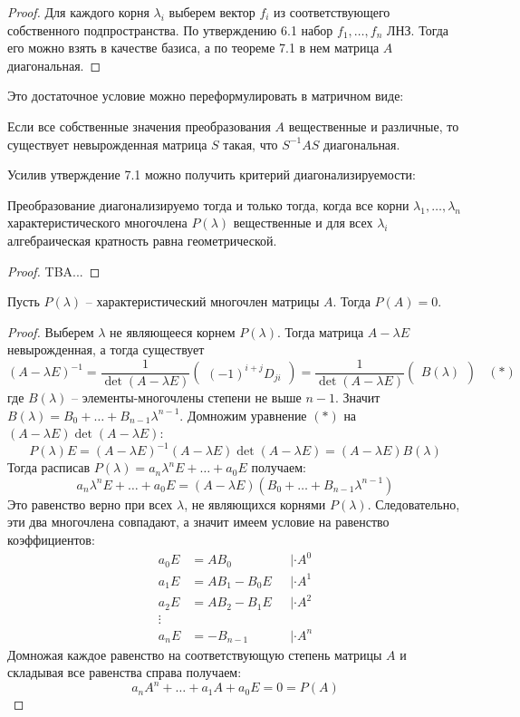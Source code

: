 \begin{proof}
    Для каждого корня $\lambda_i$ выберем вектор $f_i$ из соответствующего собственного подпространства. По утверждению 6.1 набор $f_1, \dots, f_n$ ЛНЗ. Тогда его можно взять в качестве базиса, а по теореме 7.1 в нем матрица $A$ диагональная.
\end{proof}
Это достаточное условие можно переформулировать в матричном виде:
\begin{theorem}
    Если все собственные значения преобразования $A$ вещественные и различные, то существует невырожденная матрица $S$ такая, что $S^{-1}AS$ диагональная.
\end{theorem}
Усилив утверждение 7.1 можно получить критерий диагонализируемости:
\begin{theorem} 
    Преобразование диагонализируемо тогда и только тогда, когда все корни $\lambda_1, \dots , \lambda_n$ характеристического многочлена $P(\lambda)$ вещественные и для всех $\lambda_i$ алгебраическая кратность равна геометрической.
\end{theorem}
\begin{proof}
    TBA...
\end{proof}
\begin{theorem} 
    Пусть $P(\lambda)$ -- характеристический многочлен матрицы $A$. Тогда $P(A)=0$.
\end{theorem}
\begin{proof}
    Выберем $\lambda$ не являющееся корнем $P(\lambda)$. Тогда матрица $A-\lambda E$ невырожденная, а тогда существует $$(A-\lambda E )^{-1}=\frac{1}{\det (A-\lambda E)}\begin{pmatrix}
        (-1)^{i+j}D_{ji}
    \end{pmatrix}=\frac{1}{\det (A-\lambda E)}\begin{pmatrix}
        B(\lambda)
    \end{pmatrix} \ \ \ \ (*)$$
    где $B(\lambda)$ -- элементы-многочлены степени не выше $n-1$. Значит $B(\lambda)=B_0+\dots+B_{n-1}\lambda^{n-1}$. Домножим уравнение $(*)$ на $(A-\lambda E)\det(A-\lambda E)$:
    \[
    P(\lambda)E=(A-\lambda E)^{-1}(A-\lambda E)\det(A-\lambda E)=(A-\lambda E)B(\lambda)
    \]
    Тогда расписав $P(\lambda)=a_n \lambda^nE+\dots+a_0E$ получаем:
    \[
    a_n \lambda^nE+\dots+a_0E=(A-\lambda E)(B_0+\dots+B_{n-1}\lambda^{n-1})
    \]
    Это равенство верно при всех $\lambda$, не являющихся корнями $P(\lambda)$. Следовательно, эти два многочлена совпадают, а значит имеем условие на равенство коэффициентов:
    \begin{align*}
    a_0 E &= AB_0  \ \ \ &|\cdot A^0\\
    a_1 E &= AB_1 - B_0 E\ \ \ &|\cdot A^1\\
    a_2 E &= AB_2 - B_1 E \ \ \ &|\cdot A^2\\
    \vdots \\
    a_n E&=-B_{n-1} \ \ \ &|\cdot A^n
    \end{align*}
    Домножая каждое равенство на соответствующую степень матрицы $A$ и складывая все равенства справа получаем:
    \[
    a_n A^n+\dots+a_1A+a_0E=0=P(A)
    \]
\end{proof}

